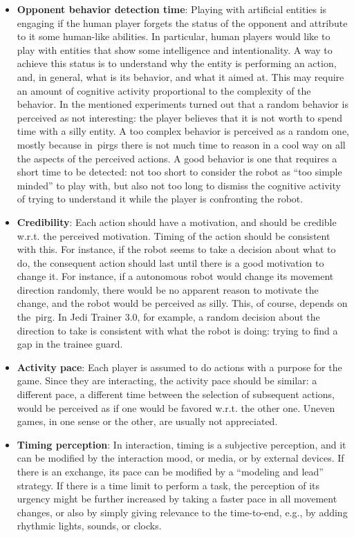 \begin{itemize}
\item \textbf{Opponent behavior detection time}: Playing with artificial entities is engaging if the human player forgets the status of the opponent and attribute to it some human-like abilities. In particular, human players would like to play with entities that show some intelligence and intentionality. A way to achieve this status is to understand why the entity is performing an action, and, in general, what is its behavior, and what it aimed at. This may require an amount of cognitive activity proportional to the complexity of the behavior. In the mentioned experiments turned out that a random behavior is perceived as not interesting: the player believes that it is not worth to spend time with a silly entity. A too complex behavior is perceived as a random one, mostly because in~\gls{pirg}s there is not much time to reason in a cool way on all the aspects of the perceived actions. A good behavior is one that requires a short time to be detected: not too short to consider the robot as ``too simple minded'' to play with, but also not too long to dismiss the cognitive activity of trying to understand it while the player is confronting the robot.

\item \textbf{Credibility}: Each action should have a motivation, and should be credible w.r.t. the perceived motivation. Timing of the action should be consistent with this. For instance, if the robot seems to take a decision about what to do, the consequent action should last until there is a good motivation to change it. For instance, if a autonomous robot would change its movement direction randomly, there would be no apparent reason to motivate the change, and the robot would be perceived as silly. This, of course, depends on the~\gls{pirg}. In Jedi Trainer 3.0, for example, a random decision about the direction to take is consistent with what the robot is doing: trying to find a gap in the trainee guard.

\item \textbf{Activity pace}: Each player is assumed to do actions with a purpose for the game. Since they are interacting, the activity pace should be similar: a different pace, a different time between the selection of subsequent actions, would be perceived as if one would be favored w.r.t. the other one. Uneven games, in one sense or the other, are usually not appreciated.

\item \textbf{Timing perception}: In interaction, timing is a subjective perception, and it can be modified by the interaction mood, or media, or by external devices. If there is an exchange, its pace can be modified by a ``modeling and lead'' strategy. If there is a time limit to perform a task, the perception of its urgency might be further increased by taking a faster pace in all movement changes, or also by simply giving relevance to the time-to-end, e.g., by adding rhythmic lights, sounds, or clocks.
\end{itemize}

